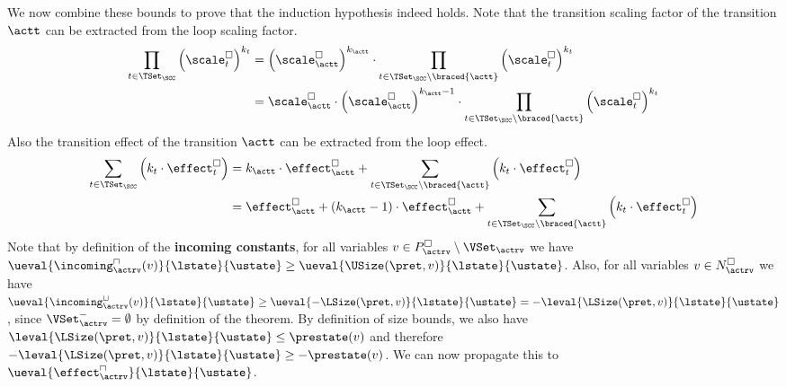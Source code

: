 We now combine these bounds to prove that the induction hypothesis indeed holds.
Note that the transition scaling factor of the transition $\actt$ can be extracted from the loop scaling factor.
\begin{equation} \label{eq:scaling_factor_reduction}
  \begin{split}
  \prod_{t \in \TSet_\SCC} \left( \scale^\square_t \right) ^{k_t} &= \left( \scale^\square_\actt \right) ^{k_\actt} \cdot \prod_{t \in \TSet_\SCC \setminus \braced{\actt}} \left( \scale^\square_t \right)^{k_t} \\
  &= \scale^\square_\actt \cdot \left( \scale^\square_\actt \right) ^{k_\actt - 1} \cdot \prod_{t \in \TSet_\SCC \setminus \braced{\actt}} \left( \scale^\square_t \right) ^{k_t}
  \end{split}
\end{equation}
Also the transition effect of the transition $\actt$ can be extracted from the loop effect.
\begin{equation} \label{eq:input_reduction}
  \begin{split}
  \sum_{t \in \TSet_\SCC} \left( k_t \cdot \effect^\square_t \right)
  & = k_\actt \cdot \effect^\square_\actt + \sum_{t \in \TSet_\SCC \setminus \braced{\actt}} \left( k_t \cdot \effect^\square_t \right) \\
  & = \effect^\square_\actt
    + \left( k_\actt - 1 \right) \cdot \effect^\square_\actt
    + \sum_{t \in \TSet_\SCC \setminus \braced{\actt}} \left(k_t \cdot \effect^\square_t \right)
  \end{split}
\end{equation}
Note that by definition of the \textbf{incoming constants}, for all variables $v \in P^\square_\actrv \setminus \VSet_\actrv$ we have $\ueval{\incoming^\sqcap_\actrv(v)}{\lstate}{\ustate} \geq \ueval{\USize(\pret, v)}{\lstate}{\ustate}$.
Also, for all variables $v \in N^\square_\actrv$ we have $\ueval{\incoming^\sqcup_\actrv(v)}{\lstate}{\ustate} \geq \ueval{-\LSize(\pret, v)}{\lstate}{\ustate} = -\leval{\LSize(\pret, v)}{\lstate}{\ustate}$, since $\VSet^-_\actrv = \emptyset$ by definition of the theorem.
By definition of size bounds, we also have $\leval{\LSize(\pret, v)}{\lstate}{\ustate} \leq \prestate(v)$ and therefore $-\leval{\LSize(\pret, v)}{\lstate}{\ustate} \geq -\prestate(v)$.
We can now propagate this to $\ueval{\effect^\sqcap_\actrv}{\lstate}{\ustate}$.

